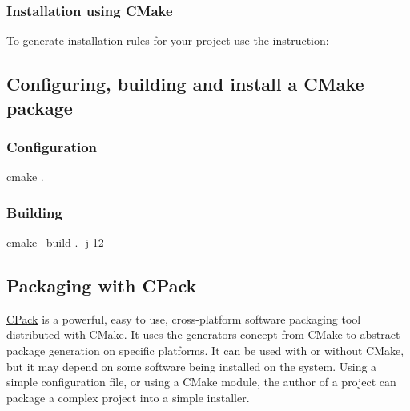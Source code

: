 \subsubsection*{Installation using CMake}

To generate installation rules for your project use the  instruction:
\begin{script}


\end{script}


\subsection{Configuring, building and install a CMake package}

\subsubsection*{Configuration}

\begin{script}
 cmake .
\end{script}

\subsubsection*{Building}

\begin{script}
 cmake --build . -j 12
\end{script}

\subsection{Packaging with CPack}

\href{https://cmake.org/cmake/help/book/mastering-cmake/chapter/Packaging\%20With\%20CPack.html}{CPack} is a powerful, easy to use, 
cross-platform software packaging tool distributed with CMake. 
It uses the generators concept from CMake to abstract package generation on specific platforms. 
It can be used with or without CMake, but it may depend on some software being installed on the system. 
Using a simple configuration file, or using a CMake module, the author of a project can package a complex project into a simple installer. 
